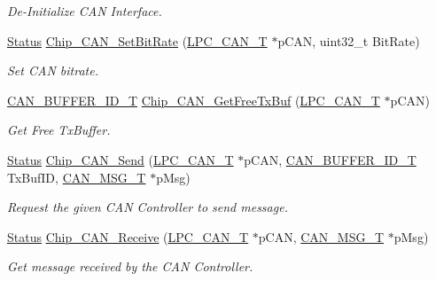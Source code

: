 \begin{DoxyCompactItemize}
\begin{DoxyCompactList}\small\item\em De-\/\-Initialize C\-A\-N Interface. \end{DoxyCompactList}\item 
\hyperlink{group__LPC__Types__Public__Types_ga67a0db04d321a74b7e7fcfd3f1a3f70b}{Status} \hyperlink{group__CAN__17XX__40XX_ga269c61b9e26af6f207632993274b04e5}{Chip\-\_\-\-C\-A\-N\-\_\-\-Set\-Bit\-Rate} (\hyperlink{structLPC__CAN__T}{L\-P\-C\-\_\-\-C\-A\-N\-\_\-\-T} $\ast$p\-C\-A\-N, uint32\-\_\-t Bit\-Rate)
\begin{DoxyCompactList}\small\item\em Set C\-A\-N bitrate. \end{DoxyCompactList}\item 
\hyperlink{group__CAN__17XX__40XX_ga073d4792bdf9dd0d8ceda6b8c3752dd9}{C\-A\-N\-\_\-\-B\-U\-F\-F\-E\-R\-\_\-\-I\-D\-\_\-\-T} \hyperlink{group__CAN__17XX__40XX_gadb33450a707ebe03be084c2783017272}{Chip\-\_\-\-C\-A\-N\-\_\-\-Get\-Free\-Tx\-Buf} (\hyperlink{structLPC__CAN__T}{L\-P\-C\-\_\-\-C\-A\-N\-\_\-\-T} $\ast$p\-C\-A\-N)
\begin{DoxyCompactList}\small\item\em Get Free Tx\-Buffer. \end{DoxyCompactList}\item 
\hyperlink{group__LPC__Types__Public__Types_ga67a0db04d321a74b7e7fcfd3f1a3f70b}{Status} \hyperlink{group__CAN__17XX__40XX_ga27767c0aa2e0c5da0e680e7e432bbc69}{Chip\-\_\-\-C\-A\-N\-\_\-\-Send} (\hyperlink{structLPC__CAN__T}{L\-P\-C\-\_\-\-C\-A\-N\-\_\-\-T} $\ast$p\-C\-A\-N, \hyperlink{group__CAN__17XX__40XX_ga073d4792bdf9dd0d8ceda6b8c3752dd9}{C\-A\-N\-\_\-\-B\-U\-F\-F\-E\-R\-\_\-\-I\-D\-\_\-\-T} Tx\-Buf\-I\-D, \hyperlink{structCAN__MSG__T}{C\-A\-N\-\_\-\-M\-S\-G\-\_\-\-T} $\ast$p\-Msg)
\begin{DoxyCompactList}\small\item\em Request the given C\-A\-N Controller to send message. \end{DoxyCompactList}\item 
\hyperlink{group__LPC__Types__Public__Types_ga67a0db04d321a74b7e7fcfd3f1a3f70b}{Status} \hyperlink{group__CAN__17XX__40XX_gadbb9fadb00c42f7c33f0ed06876a8a03}{Chip\-\_\-\-C\-A\-N\-\_\-\-Receive} (\hyperlink{structLPC__CAN__T}{L\-P\-C\-\_\-\-C\-A\-N\-\_\-\-T} $\ast$p\-C\-A\-N, \hyperlink{structCAN__MSG__T}{C\-A\-N\-\_\-\-M\-S\-G\-\_\-\-T} $\ast$p\-Msg)
\begin{DoxyCompactList}\small\item\em Get message received by the C\-A\-N Controller. \end{DoxyCompactList}\item 

\end{DoxyCompactItemize}
